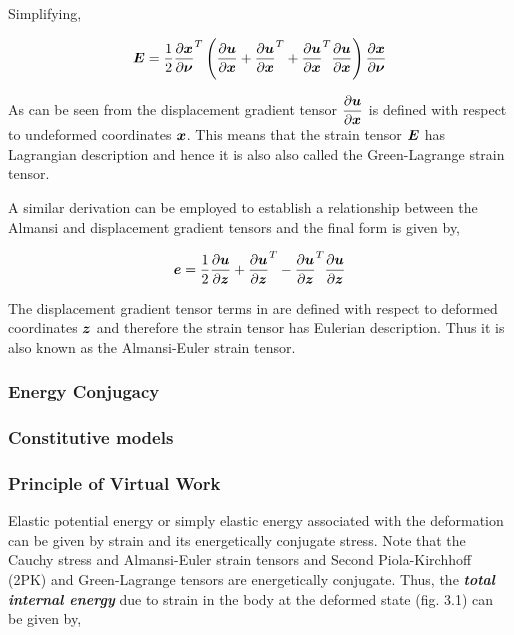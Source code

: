 \noindent Simplifying,

\begin{equation}
  \matr{E}=\frac{1}{2}\transpose{\delby{\vect{x}}{\vect{\nu}}}
           \pbrac{\delby{\vect{u}}{\vect{x}}+\transpose{\delby{\vect{u}}{\vect{x}}}+
	   \transpose{\delby{\vect{u}}{\vect{x}}}\delby{\vect{u}}{\vect{x}}}
	   \delby{\vect{x}}{\vect{\nu}}
  \label{eqn:greendisplacement2}
\end{equation}
 
As can be seen from  the displacement gradient
tensor $\delby{\vect{u}}{\vect{x}}$ is defined with respect to undeformed
coordinates $\vect{x}$. This means that the strain tensor $\matr{E}$ has
Lagrangian description and hence it is also also called the Green-Lagrange
strain tensor.
 
A similar derivation can be employed to establish a relationship between the
Almansi and displacement gradient tensors and the final form is given by,

\begin{equation}
  \vect{e}=\frac{1}{2}\delby{\vect{u}}{\vect{z}}+\transpose{\delby{\vect{u}}{\vect{z}}}-
	   \transpose{\delby{\vect{u}}{\vect{z}}}\delby{\vect{u}}{\vect{z}}
  \label{eqn:almansidisplacement}
\end{equation}
 
The displacement gradient tensor terms in  are defined with respect to deformed coordinates $\vect{z}$ and
therefore the strain tensor has Eulerian description. Thus it is also known as the Almansi-Euler strain tensor.

\subsubsection{Energy Conjugacy}



\subsubsection{Constitutive models}



\subsubsection{Principle of Virtual Work}
Elastic potential energy or simply elastic energy associated with the
deformation can be given by strain and its energetically conjugate stress.
Note that the Cauchy stress and Almansi-Euler strain tensors and Second
Piola-Kirchhoff (2PK) and Green-Lagrange tensors are energetically
conjugate. Thus, the \textit{\textbf{total internal energy}} due to strain in
the body at the deformed state (fig. 3.1) can be given by,
 
